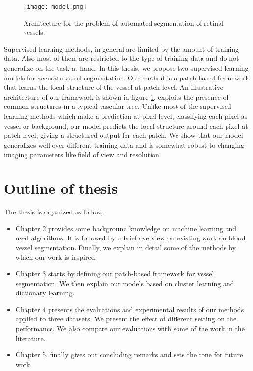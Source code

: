 \begin{figure}
	\centering	
	\texttt{[image: model.png]}
	\caption{Architecture for the problem of automated segmentation of retinal vessels.}
	\label{fig:basicmodel}		
\end{figure}
Supervised learning methods, in general are limited by the amount of training data. Also most of them are restricted to the type of training data and do not generalize on the task at hand. In this thesis, we propose two supervised learning models for accurate vessel segmentation. Our method is a patch-based framework that learns the local structure of the vessel at patch level. An illustrative architecture of our framework is shown in figure \ref{fig:basicmodel}, exploits the presence of common structures in a typical vascular tree. Unlike most of the supervised learning methods which make a prediction at pixel level, classifying each pixel as vessel or background, our model predicts the local structure around each pixel at patch level, giving a structured output for each patch. We show that our model generalizes well over different training data and is somewhat robust to changing imaging parameters like field of view and resolution.

\section{Outline of thesis}
The thesis is organized as follow,
\begin{itemize}
	\item Chapter 2 provides some background knowledge on machine learning and used algorithms. It is followed by a brief overview on existing work on blood vessel segmentation. Finally, we explain in detail some of the methods by which our work is inspired.
	\item Chapter 3 starts by defining our patch-based framework for vessel segmentation. We then explain our models based on cluster learning and dictionary learning.
	\item Chapter 4 presents the evaluations and experimental results of our methods applied to three datasets. We present the effect of different setting on the performance. We also compare our evaluations with some of the work in the literature.
	\item Chapter 5, finally gives our concluding remarks and sets the tone for future work.
\end{itemize}